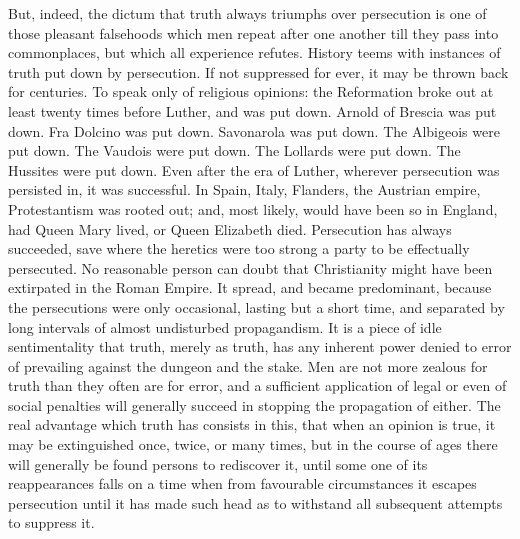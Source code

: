 \documentclass[11pt,openany]{book}
\begin{document}
But, indeed, the dictum that truth always triumphs over persecution is one of those pleasant falsehoods which men repeat after one another till they pass into commonplaces, but which all experience refutes. History teems with instances of truth put down by persecution. If not suppressed for ever, it may be thrown back for centuries. To speak only of religious opinions: the Reformation broke out at least twenty times before Luther, and was put down. Arnold of Brescia was put down. Fra Dolcino was put down. Savonarola was put down. The Albigeois were put down. The Vaudois were put down. The Lollards were put down. The Hussites were put down. Even after the era of Luther, wherever persecution was persisted in, it was successful. In Spain, Italy, Flanders, the Austrian empire, Protestantism was rooted out; and, most likely, would have been so in England, had Queen Mary lived, or Queen Elizabeth died. Persecution has always succeeded, save where the heretics were too strong a party to be effectually persecuted. No reasonable person can doubt that Christianity might have been extirpated in the Roman Empire. It spread, and became predominant, because the persecutions were only occasional, lasting but a short time, and separated by long intervals of almost undisturbed propagandism. It is a piece of idle sentimentality that truth, merely as truth, has any inherent power denied to error of prevailing against the dungeon and the stake. Men are not more zealous for truth than they often are for error, and a sufficient application of legal or even of social penalties will generally succeed in stopping the propagation of either. The real advantage which truth has consists in this, that when an opinion is true, it may be extinguished once, twice, or many times, but in the course of ages there will generally be found persons to rediscover it, until some one of its reappearances falls on a time when from favourable circumstances it escapes persecution until it has made such head as to withstand all subsequent attempts to suppress it.
\end{document}
